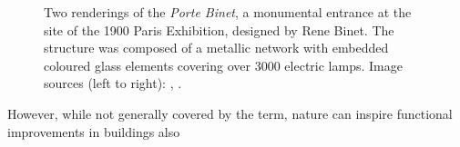 \documentclass{article}
\begin{document}
\begin{figure}[ht!]
    \centering
    \caption{Two renderings of the \textit{Porte Binet}, a monumental entrance at the site of the 1900 Paris Exhibition, designed by Rene Binet. The structure was composed of a metallic network with embedded coloured glass elements covering over 3000 electric lamps. \newline Image sources (left to right): \cite{louis_porte_1900}, \cite{binet_projet_1898}.}
    \label{fig:porte_binet}
\end{figure}

\clearpage

\begin{multicols}{2}
    
However, while not generally covered by the term, nature can inspire functional improvements in buildings also

\end{multicols}
\end{document}

